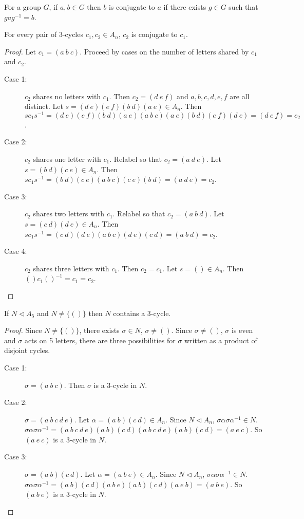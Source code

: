 \documentclass[a4paper]{article}
\begin{document}
\begin{definition}
For a group $G$, if $a, b \in G$ then $b$ is conjugate to $a$ if there exists $g \in G$ such that $g a g^{-1} = b$.
\end{definition}

\begin{theorem}
\label{conjugatetheorem}
For every pair of 3-cycles $c_1, c_2 \in A_n$, $c_2$ is conjugate to $c_1$.
\end{theorem}
\begin{proof}
Let $c_1 = (a\ b\ c)$. Proceed by cases on the number of letters shared by $c_1$ and $c_2$.
\begin{description}
   \item[Case 1:]$c_2$ shares no letters with $c_1$.
   Then $c_2 = (d\ e\ f)$ and $a, b, c, d, e, f$ are all distinct. Let $s = (d\ e)(e\ f)(b\ d)(a\ e) \in A_n$. Then $s c_1 s^{-1} = (d\ e)(e\ f)(b\ d)(a\ e)(a\ b\ c)(a\ e)(b\ d)(e\ f)(d\ e) = (d\ e\ f) = c_2$.
   \item[Case 2:]$c_2$ shares one letter with $c_1$.
   Relabel so that $c_2 = (a\ d\ e)$. Let $s = (b\ d)(c\ e) \in A_n$. Then $s c_1 s^{-1} = (b\ d)(c\ e)(a\ b\ c)(c\ e)(b\ d) = (a\ d\ e) = c_2$.
   \item[Case 3:]$c_2$ shares two letters with $c_1$.
   Relabel so that $c_2 = (a\ b\ d)$. Let $s = (c\ d)(d\ e) \in A_n$. Then $s c_1 s^{-1} = (c\ d)(d\ e)(a\ b\ c)(d\ e)(c\ d) = (a\ b\ d) = c_2$.
   \item[Case 4:]$c_2$ shares three letters with $c_1$.
   Then $c_2 = c_1$. Let $s = () \in A_n$. Then $() c_1 ()^{-1} = c_1 = c_2$.
\end{description}
\end{proof}

\begin{lemma}
\label{threecyclelemma}
If $N \triangleleft A_5$ and $N \ne \{()\}$ then $N$ contains a 3-cycle.
\end{lemma}
\begin{proof}
Since $N \ne \{()\}$, there exists $\sigma \in N$, $\sigma \ne ()$. Since $\sigma \ne ()$, $\sigma$ is even and $\sigma$ acts on 5 letters, there are three possibilities for $\sigma$ written as a product of disjoint cycles.
\begin{description}
    \item[Case 1:]
    $\sigma = (a\ b\ c)$. Then $\sigma$ is a 3-cycle in $N$.
    \item[Case 2:]
    $\sigma = (a\ b\ c\ d\ e)$. Let $\alpha = (a\ b)(c\ d) \in A_n$. Since $N \triangleleft A_n$, $\sigma \alpha \sigma \alpha^{-1} \in N$. $\sigma \alpha \sigma \alpha^{-1} = (a\ b\ c\ d\ e)(a\ b)(c\ d)(a\ b\ c\ d\ e)(a\ b)(c\ d) = (a\ e\ c)$. So $(a\ e\ c)$ is a 3-cycle in $N$.
    \item[Case 3:]
    $\sigma = (a\ b)(c\ d)$. Let $\alpha = (a\ b\ e) \in A_n$. Since $N \triangleleft A_n$, $\sigma \alpha \sigma \alpha^{-1} \in N$. $\sigma \alpha \sigma \alpha^{-1} = (a\ b)(c\ d)(a\ b\ e)(a\ b)(c\ d)(a\ e\ b) = (a\ b\ e)$. So $(a\ b\ e)$ is a 3-cycle in $N$.
\end{description}
\end{proof}
\end{document}
